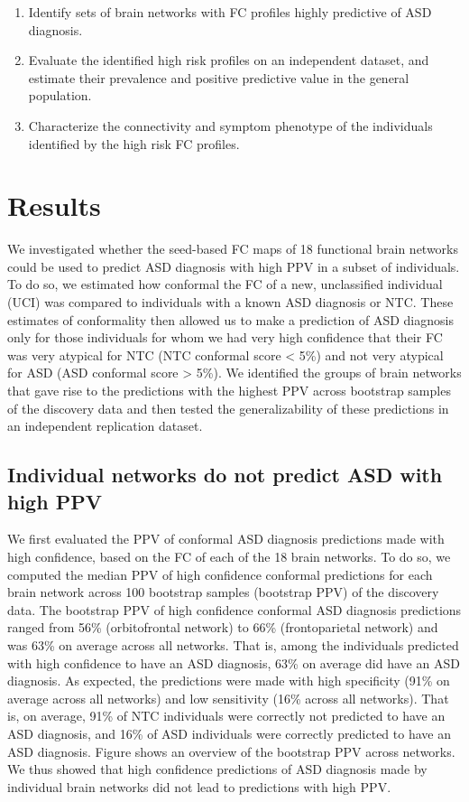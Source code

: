 \documentclass[9pt,lineno]{elife}
\begin{document}
\begin{enumerate}
    \item Identify sets of brain networks with FC profiles highly predictive of ASD diagnosis.
    \item Evaluate the identified high risk profiles on an independent dataset, and estimate their prevalence and positive predictive value in the general population.
    \item Characterize the connectivity and symptom phenotype of the individuals identified by the high risk FC profiles.
\end{enumerate}

\section{Results}
We investigated whether the seed-based FC maps of 18 functional brain networks could be used to predict ASD diagnosis with high PPV in a subset of individuals. To do so, we estimated how conformal the FC of a new, unclassified individual (UCI) was compared to individuals with a known ASD diagnosis or NTC. These estimates of conformality then allowed us to make a prediction of ASD diagnosis only for those individuals for whom we had very high confidence that their FC was very atypical for NTC (NTC conformal score < 5\%) and not very atypical for ASD (ASD conformal score > 5\%). We identified the groups of brain networks that gave rise to the predictions with the highest PPV across bootstrap samples of the discovery data and then tested the generalizability of these predictions in an independent replication dataset.

\subsection{Individual networks do not predict ASD with high PPV}
We first evaluated the PPV of conformal ASD diagnosis predictions made with high confidence, based on the FC of each of the 18 brain networks. To do so, we computed the median PPV of high confidence conformal predictions for each brain network across 100 bootstrap samples (bootstrap PPV) of the discovery data. The bootstrap PPV of high confidence conformal ASD diagnosis predictions ranged from 56\% (orbitofrontal network) to 66\% (frontoparietal network) and was 63\% on average across all networks. That is, among the individuals predicted with high confidence to have an ASD diagnosis, 63\% on average did have an ASD diagnosis. As expected, the predictions were made with high specificity (91\% on average across all networks) and low sensitivity (16\% across all networks). That is, on average, 91\% of NTC individuals were correctly not predicted to have an ASD diagnosis, and 16\% of ASD individuals were correctly predicted to have an ASD diagnosis. Figure  shows an overview of the bootstrap PPV across networks. We thus showed that high confidence predictions of ASD diagnosis made by individual brain networks did not lead to predictions with high PPV. 
\end{document}
